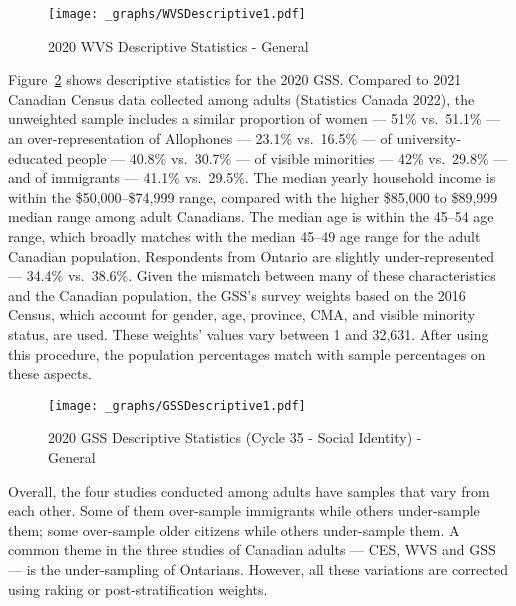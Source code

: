 \documentclass[
  letterpaper,
  DIV=11,
  numbers=noendperiod]{scrreprt}
\begin{document}
\begin{figure}

{\centering \texttt{[image: \_graphs/WVSDescriptive1.pdf]}

}

\caption{\label{fig-wvs}2020 WVS Descriptive Statistics - General}

\end{figure}

Figure~\ref{fig-gss} shows descriptive statistics for the 2020 GSS.
Compared to 2021 Canadian Census data collected among adults (Statistics
Canada 2022), the unweighted sample includes a similar proportion of
women --- 51\% vs.~51.1\% --- an over-representation of Allophones ---
23.1\% vs.~16.5\% --- of university-educated people --- 40.8\%
vs.~30.7\% --- of visible minorities --- 42\% vs.~29.8\% --- and of
immigrants --- 41.1\% vs.~29.5\%. The median yearly household income is
within the \$50,000--\$74,999 range, compared with the higher \$85,000
to \$89,999 median range among adult Canadians. The median age is within
the 45--54 age range, which broadly matches with the median 45--49 age
range for the adult Canadian population. Respondents from Ontario are
slightly under-represented --- 34.4\% vs.~38.6\%. Given the mismatch
between many of these characteristics and the Canadian population, the
GSS's survey weights based on the 2016 Census, which account for gender,
age, province, CMA, and visible minority status, are used. These
weights' values vary between 1 and 32,631. After using this procedure,
the population percentages match with sample percentages on these
aspects.

\begin{figure}

{\centering \texttt{[image: \_graphs/GSSDescriptive1.pdf]}

}

\caption{\label{fig-gss}2020 GSS Descriptive Statistics (Cycle 35 -
Social Identity) - General}

\end{figure}

Overall, the four studies conducted among adults have samples that vary
from each other. Some of them over-sample immigrants while others
under-sample them; some over-sample older citizens while others
under-sample them. A common theme in the three studies of Canadian
adults --- CES, WVS and GSS --- is the under-sampling of Ontarians.
However, all these variations are corrected using raking or
post-stratification weights.
\end{document}
